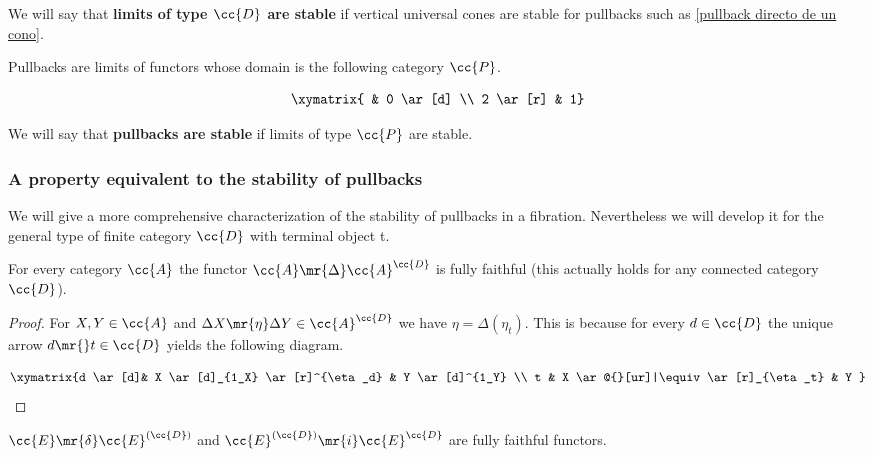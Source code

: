 \begin{definition}
We will say that \textbf{limits of type $\cc{D}$ are stable}  if vertical universal cones are stable for pullbacks such as \ref{pullback directo de un cono}.
\end{definition}

\begin{observation}\label{definicion mala de estable}
Pullbacks are limits of functors whose domain is the following category $\cc{P}$.

\[
\xymatrix{ &  0  \ar [d] \\
		  2  \ar [r]  &  1}
\]

\end{observation}

\begin{definition}
 We will say that \textbf{pullbacks are stable}  if limits of type $\cc{P}$ are stable.
\end{definition}



\subsubsection{A property equivalent to the stability of pullbacks}


We will give a more comprehensive characterization of the stability of pullbacks in a fibration. Nevertheless we will develop it for the general type of finite category $\cc{D}$ with terminal object t.

\begin{lemma}
For every category $\cc{A}$ the functor $\cc{A} \mr{\Delta} \cc{A}^{\cc{D}}$ is fully faithful (this actually holds for any connected category $\cc{D}$).
\end{lemma}

\begin{proof}
 For $X,Y \in \cc{A}$ and ${\Delta X \mr{\eta} \Delta Y \in \cc{A}^{\cc{D}}}$ we have ${\eta=\Delta(\eta_t)}$. This is because for every $d\in\cc{D}$ the unique arrow $d \mr{} t \in \cc{D}$ yields the following diagram.

\[
\xymatrix{d \ar[d]& X \ar[d]_{1_X} \ar[r]^{\eta_d} & Y \ar[d]^{1_Y} \\
		  t & X \ar@{}[ur]|\equiv \ar[r]_{\eta_t} & Y }
\]


\end{proof}

\begin{corollary}
$\cc{E} \mr{\delta} \cc{E}^{(\cc{D})}$ and  $\cc{E}^{(\cc{D})} \mr{i} \cc{E}^{\cc{D}}$ are fully faithful functors. 
\end{corollary}

